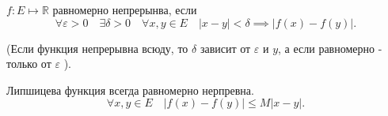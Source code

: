 \begin{definition} \thmslashn

    $f: E \mapsto \mathbb{R}$ равномерно непрерынва, если
    \[ \forall{\varepsilon > 0}\quad \exists{\delta > 0}\quad \forall{x, y\in E}\quad |x-y| < \delta \implies|f(x)-f(y)| .\]
    
    (Если функция непрерывна всюду, то $\delta$ зависит от $\varepsilon$ и $y$, а если равномерно - только от $\varepsilon$ ).
\end{definition}
\begin{remark} \thmslashn

    Липшицева функция всегда равномерно нерпревна.
    \[ \forall{x, y\in E} \quad |f(x) - f(y)| \le M |x-y|.\] 
\end{remark}

